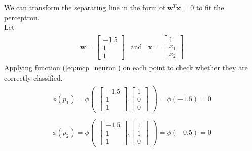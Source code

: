 We can transform the separating line in the form of $\textbf{w}^T\textbf{x} = 0$ to fit the perceptron.\\
Let 
\begin{align}
  \begin{matrix}
    \textbf{w} = \begin{bmatrix}
      -1.5 \\
      1 \\
      1
    \end{bmatrix} & \text{and} & \textbf{x} = \begin{bmatrix}
      1 \\
      x_1 \\
      x_2
    \end{bmatrix}
  \end{matrix}
\end{align}
Applying function (\ref{eq:mcp_neuron}) on each point to check whether they are correctly classified.
\begin{align}
  \nonumber
  \begin{matrix}
    \phi(p_1) = \phi\begin{pmatrix}
      \begin{bmatrix}
        -1.5 \\
        1 \\
        1 
      \end{bmatrix}.\begin{bmatrix}
        1 \\
        0 \\
        0
      \end{bmatrix}
    \end{pmatrix} = \phi(-1.5) = 0 
  \end{matrix}
\end{align}
\begin{align}
  \nonumber
  \begin{matrix}
    \phi(p_2) = \phi\begin{pmatrix}
      \begin{bmatrix}
        -1.5 \\
        1 \\
        1 
      \end{bmatrix}.\begin{bmatrix}
        1 \\
        1 \\
        0
      \end{bmatrix}
    \end{pmatrix} = \phi(-0.5) = 0
  \end{matrix}
\end{align}
